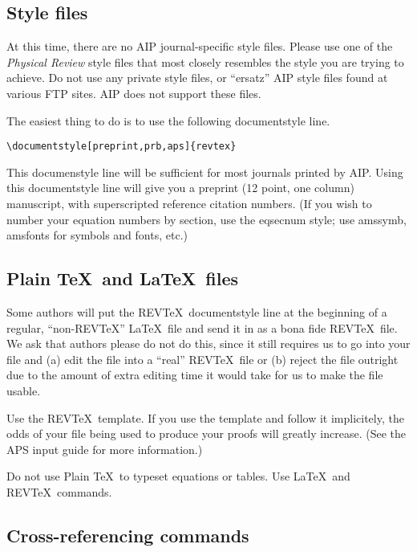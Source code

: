 \subsection{Style files}

At this time, there are no AIP journal-specific style files. Please
use one of the {\it Physical Review} style files that most closely resembles the style
you are trying to achieve. Do not use any private style files, or
``ersatz'' AIP style files found at various FTP sites. AIP does
not support these files.

The easiest thing to do is to use the following documentstyle line.
\begin{center}
\begin{verbatim}
\documentstyle[preprint,prb,aps]{revtex}
\end{verbatim}
\end{center}
This documenstyle line will be sufficient for most journals printed
by AIP.
Using this documentstyle line will give you a preprint (12 point,
one column) manuscript, with superscripted reference citation numbers.
(If you wish to number your equation numbers by section, use the
eqsecnum style; use amssymb, amsfonts for symbols and fonts, etc.)

\subsection{Plain \TeX\ and La\TeX\ files}

Some authors will put the REV\TeX\ documentstyle line at the beginning
of a regular, ``non-REV\TeX\/''  \LaTeX\ file and send it 
in as a bona fide REV\TeX\
file. We ask that authors please do not do this, since it still requires
us to go into your file and (a) edit the file into a ``real'' REV\TeX\
file or (b) reject the file outright due to the amount of extra editing
time it would take for us to make the file usable.

Use the REV\TeX\ template. If you use the template and
follow it implicitely, the odds of your file being used to
produce your proofs will greatly increase. (See the APS input 
guide for more information.)

Do not use Plain \TeX\ to typeset equations or tables. Use \LaTeX\ and REV\TeX\
commands. 

\subsection{Cross-referencing commands}

